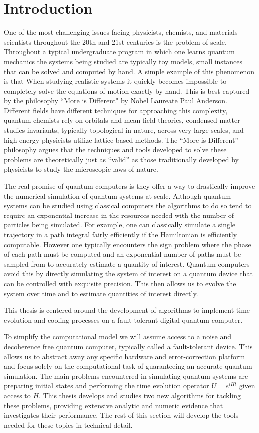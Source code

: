 \chapter{Introduction}
One of the most challenging issues facing physicists, chemists, and materials scientists throughout the 20th and 21st centuries is the problem of scale. Throughout a typical undergraduate program in which one learns quantum mechanics the systems being studied are typically toy models, small instances that can be solved and computed by hand. A simple example of this phenomenon is that When studying realistic systems it quickly becomes impossible to completely solve the equations of motion exactly by hand. This is best captured by the philosophy ``More is Different" by Nobel Laureate Paul Anderson. Different fields have different techniques for approaching this complexity, quantum chemists rely on orbitals and mean-field theories, condensed matter studies invariants, typically topological in nature, across very large scales, and high energy physicists utilize lattice based methods. The ``More is Different'' philosophy argues that the techniques and tools developed to solve these problems are theoretically just as ``valid'' as those traditionally developed by physicists to study the microscopic laws of nature.

The real promise of quantum computers is they offer a way to drastically improve the numerical simulation of quantum systems at scale. Although quantum systems can be studied using classical computers the algorithms to do so tend to require an exponential increase in the resources needed with the number of particles being simulated. For example, one can classically simulate a single trajectory in a path integral fairly efficiently if the Hamiltonian is efficiently computable. However one typically encounters the sign problem where the phase of each path must be computed and an exponential number of paths must be sampled from to accurately estimate a quantity of interest. Quantum computers avoid this by directly simulating the system of interest on a quantum device that can be controlled with exquisite precision. This then allows us to evolve the system over time and to estimate quantities of interest directly. 

This thesis is centered around the development of algorithms to implement time evolution and cooling processes on a fault-tolerant digital quantum computer. 

To simplify the computational model we will assume access to a noise and decoherence free quantum computer, typically called a fault-tolerant device. This allows us to abstract away any specific hardware and error-correction platform and focus solely on the computational task of guaranteeing an accurate quantum simulation. The main problems encountered in simulating quantum systems are preparing initial states and performing the time evolution operator $U = e^{i H t}$ given access to $H$. This thesis develops and studies two new algorithms for tackling these problems, providing extensive analytic and numeric evidence that investigates their performance. The rest of this section will develop the tools needed for these topics in technical detail. 